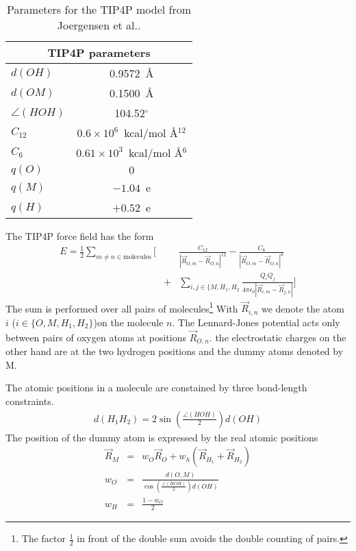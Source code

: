 \documentclass[11pt,a4paper]{report}
\begin{document}
\begin{table}[htb!]
\begin{center}
\begin{tabular}{|l|c|}
\hline
\hline
\multicolumn{2}{|c|}{TIP4P parameters}\\
\hline
$d(OH)$ & 0.9572~\AA\\
$d(OM)$ & 0.1500~\AA\\
$\angle(HOH)$ & 104.52$^\circ$\\
$C_{12}$ & $0.6\times 10^6$~kcal/mol \AA$^{12}$\\
$C_{6}$ & $0.61\times 10^3$~kcal/mol \AA$^{6}$\\
$q(O)$ & $0$\\
$q(M)$ & $-1.04$~e \\
$q(H)$ & $+0.52$~e \\
\hline
\hline
\end{tabular}
\end{center}
\caption{\label{tab:tip4ppar} Parameters for the TIP4P model from
    Joergensen et al.\cite{jorgensen83_jcp79_926}.}
\end{table}

The TIP4P force field has the form
\begin{eqnarray}
E=\frac{1}{2}\sum_{m\neq n\in\text{molecules}} 
\biggl[&&
\frac{C_{12}}{|\vec{R}_{O,m}-\vec{R}_{O,n}|^{12}}
-\frac{C_{6}}{|\vec{R}_{O,m}-\vec{R}_{O,n}|^{6}}
\nonumber\\
&+&\sum_{i,j\in\{M,H_1,H_2}\frac{Q_iQ_j}
{4\pi\epsilon_0|\vec{R}_{i,m}-\vec{R}_{j,n}|}
\biggr]
\end{eqnarray}
The sum is performed over all pairs of molecules\footnote{The factor
  $\frac{1}{2}$ in front of the double sum avoids the double counting
  of pairs.}  With $\vec{R}_{i,n}$ we denote the atom $i$
($i\in\{O,M,H_1,H_2\}$)on the molecule $n$.  The Lennard-Jones
potential acts only between pairs of oxygen atoms at positions
$\vec{R}_{O,n}$. the electrostatic charges on the other hand are at
the two hydrogen positions and the dummy atoms denoted by M.

The atomic positions in a molecule are constained by three bond-length
constraints. 
\begin{eqnarray}
d(H_1H_2)=2 \sin\left(\frac{\angle(HOH)}{2}\right) d(OH)
\end{eqnarray}
The position of the dummy atom is expressed by the real atomic positions
\begin{eqnarray}
\vec{R}_M&=&w_O \vec{R}_O+w_h\left(\vec{R}_{H_1}+\vec{R}_{H_2}\right)
\nonumber\\
w_O&=&\frac{d(O,M)}{\cos\left(\frac{\angle(HOH)}{2}\right) d(OH)}
\\
w_H&=&\frac{1-w_O}{2}
\end{eqnarray}
\end{document}
